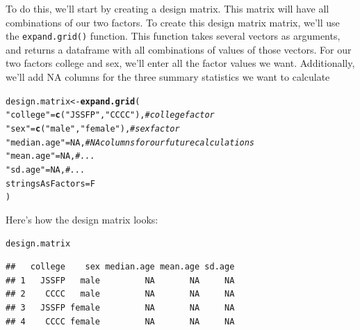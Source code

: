 \documentclass{tufte-book}\usepackage[]{graphicx}\usepackage[]{color}
\makeatletter
\newcommand{\hlnum}[1]{\textcolor[rgb]{0.686,0.059,0.569}{#1}}%
\newcommand{\hlstr}[1]{\textcolor[rgb]{0.192,0.494,0.8}{#1}}%
\newcommand{\hlcom}[1]{\textcolor[rgb]{0.678,0.584,0.686}{\textit{#1}}}%
\newcommand{\hlstd}[1]{\textcolor[rgb]{0.345,0.345,0.345}{#1}}%
\newcommand{\hlkwb}[1]{\textcolor[rgb]{0.69,0.353,0.396}{#1}}%
\newcommand{\hlkwc}[1]{\textcolor[rgb]{0.333,0.667,0.333}{#1}}%
\newcommand{\hlkwd}[1]{\textcolor[rgb]{0.737,0.353,0.396}{\textbf{#1}}}%
\newenvironment{kframe}{%
 \def\at@end@of@kframe{}%
 \ifinner\ifhmode%
  \def\at@end@of@kframe{\end{minipage}}%
  \begin{minipage}{\columnwidth}%
 \fi\fi%
 \def\FrameCommand##1{\hskip\@totalleftmargin \hskip-\fboxsep
 \colorbox{shadecolor}{##1}\hskip-\fboxsep
     \hskip-\linewidth \hskip-\@totalleftmargin \hskip\columnwidth}%
 \MakeFramed {\advance\hsize-\width
   \@totalleftmargin\z@ \linewidth\hsize
   \@setminipage}}%
 {\par\unskip\endMakeFramed%
 \at@end@of@kframe}
\newenvironment{knitrout}{}{} %
\makeatother
\begin{document}
\begin{footnotesize}
To do this, we'll start by creating a design matrix. This matrix will have all combinations of our two factors. To create this design matrix matrix, we'll use the \texttt{expand.grid()} function. This function takes several vectors as arguments, and returns a dataframe with all combinations of values of those vectors. For our two factors college and sex, we'll enter all the factor values we want. Additionally, we'll add NA columns for the three summary statistics we want to calculate

\begin{knitrout}
\color{fgcolor}\begin{kframe}
\begin{alltt}
\hlstd{design.matrix} \hlkwb{<-} \hlkwd{expand.grid}\hlstd{(}
                             \hlstr{"college"} \hlstd{=} \hlkwd{c}\hlstd{(}\hlstr{"JSSFP"}\hlstd{,} \hlstr{"CCCC"}\hlstd{),} \hlcom{# college factor}
                             \hlstr{"sex"} \hlstd{=} \hlkwd{c}\hlstd{(}\hlstr{"male"}\hlstd{,} \hlstr{"female"}\hlstd{),} \hlcom{# sex factor}
                             \hlstr{"median.age"} \hlstd{=} \hlnum{NA}\hlstd{,} \hlcom{# NA columns for our future calculations}
                             \hlstr{"mean.age"} \hlstd{=} \hlnum{NA}\hlstd{,} \hlcom{#...}
                             \hlstr{"sd.age"} \hlstd{=} \hlnum{NA}\hlstd{,} \hlcom{#...}
                             \hlkwc{stringsAsFactors} \hlstd{= F}
                             \hlstd{)}
\end{alltt}
\end{kframe}
\end{knitrout}

Here's how the design matrix looks:

\begin{knitrout}
\color{fgcolor}\begin{kframe}
\begin{alltt}
\hlstd{design.matrix}
\end{alltt}
\begin{verbatim}
##   college    sex median.age mean.age sd.age
## 1   JSSFP   male         NA       NA     NA
## 2    CCCC   male         NA       NA     NA
## 3   JSSFP female         NA       NA     NA
## 4    CCCC female         NA       NA     NA
\end{verbatim}
\end{kframe}
\end{knitrout}



\end{footnotesize}
\end{document}
